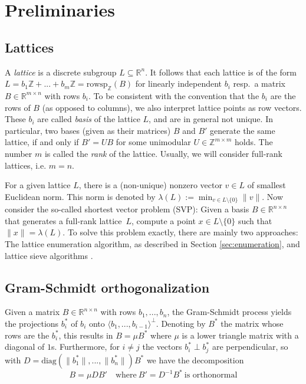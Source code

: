 \documentclass{scrartcl}
\newcommand{\Z}{\mathbb{Z}}
\newcommand{\R}{\mathbb{R}}
\begin{document}
    \section{Preliminaries}

    \subsection{Lattices}

    A \emph{lattice} is a discrete subgroup $L \subseteq \R^n$. 
    It follows that each lattice is of the form $L = b_1 \Z + ... + b_m \Z = \mathrm{rowsp}_{\Z}(B)$ for linearly independent $b_i$ resp.\ a matrix $B \in \R^{m \times n}$ with rows $b_i$.
    To be consistent with the convention that the $b_i$ are the rows of $B$ (as opposed to columns), we also interpret lattice points as row vectors. 
    These $b_i$ are called \emph{basis} of the lattice $L$, and are in general not unique. 
    In particular, two bases (given as their matrices) $B$ and $B'$ generate the same lattice, if and only if $B' = UB$ for some unimodular $U \in \Z^{m \times m}$ holds.
    The number $m$ is called the \emph{rank} of the lattice. Usually, we will consider full-rank lattices, i.e. $m = n$.

    For a given lattice $L$, there is a (non-unique) nonzero vector $v \in L$ of smallest Euclidean norm. This norm is denoted by $\lambda(L) := \min_{v \in L \setminus \{0\}} \| v \|$. 
    Now consider the so-called shortest vector problem (SVP): Given a basis $B \in \R^{n \times n}$ that generates a full-rank lattice~$L$, compute a point $x \in L \setminus \{0\}$ such that $\| x \| = \lambda(L)$. 
    To solve this problem exactly, there are mainly two approaches: The lattice enumeration algorithm, as described in Section \ref{sec:enumeration}, and lattice sieve algorithms \cite{sieve, g6k}.

    \subsection{Gram-Schmidt orthogonalization}

    Given a matrix $B \in \R^{n \times n}$ with rows $b_1, ..., b_n$, the Gram-Schmidt process yields the projections $b^*_i$ of $b_i$ onto $\langle b_1, ..., b_{i - 1} \rangle ^ \perp$. 
    Denoting by $B^*$ the matrix whose rows are the $b^*_i$, this results in $B = \mu B^*$ where $\mu$ is a lower triangle matrix with a diagonal of $1$s. 
    Furthermore, for $i \neq j$ the vectors $b^*_i \perp b^*_j$ are perpendicular, so with $D = \mathrm{diag}( \|b^*_1\|, ..., \|b^*_n\| ) B^*$ we have the decomposition
    \begin{equation*}
        B = \mu D B' \quad \text{where} \ B' = D^{-1} B^* \ \text{is orthonormal}
    \end{equation*}
\end{document}
